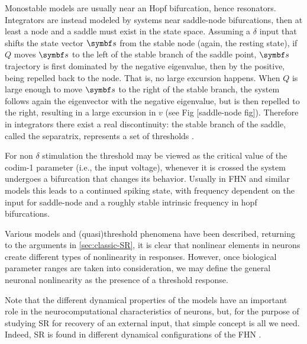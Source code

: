 Monostable models are usually near an Hopf bifurcation, hence resonators. 
Integrators are instead modeled by systems near saddle-node bifurcations, then at least a node and a saddle must exist in the state space. 
Assuming a $\delta$ input that shifts the state vector $\vb{s}$ from the stable node (again, the resting state), if $Q$ moves $\vb{s}$ to the left of the stable branch of the saddle point, $\vb{s}$ trajectory is first dominated by the negative eigenvalue, then by the positive, being repelled back to the node. 
That is, no large excursion happens. 
When $Q$ is large enough to move $\vb{s}$ to the right of the stable branch, the system follows again the eigenvector with the negative eigenvalue, but is then repelled to the right, resulting in a large excursion in $v$ (see Fig [saddle-node fig]). 
Therefore in integrators there exist a real discontinuity: the stable branch of the saddle, called the separatrix, represents a set of thresholds \cite{mitryExcitableNeuronsFiring2013}. 

For non $\delta$ stimulation the threshold may be viewed as the critical value of the codim-1 parameter (i.e., the input voltage), whenever it is crossed the system undergoes a bifurcation that changes its behavior. 
Usually in FHN and similar models this leads to a continued spiking state, with frequency dependent on the input for saddle-node and a roughly stable intrinsic frequency in hopf bifurcations. 

Various models and (quasi)threshold phenomena have been described, returning to the arguments in \ref{sec:classic-SR}, it is clear that nonlinear elements in neurons create different types of nonlinearity in responses. 
However, once biological parameter ranges are taken into consideration, we may define the general neuronal nonlinearity as the presence of a threshold response. 

Note that the different dynamical properties of the models have an important role in the neurocomputational characteristics of neurons, but, for the purpose of studying SR for recovery of an external input, that simple concept is all we need. 
Indeed, SR is found in different dynamical configurations of the FHN \cite{longtinStochasticResonanceNeuron1993a,peiDetectionThresholdNoise1995,makarovSpikingBehaviorNoiseDriven2001}. 

